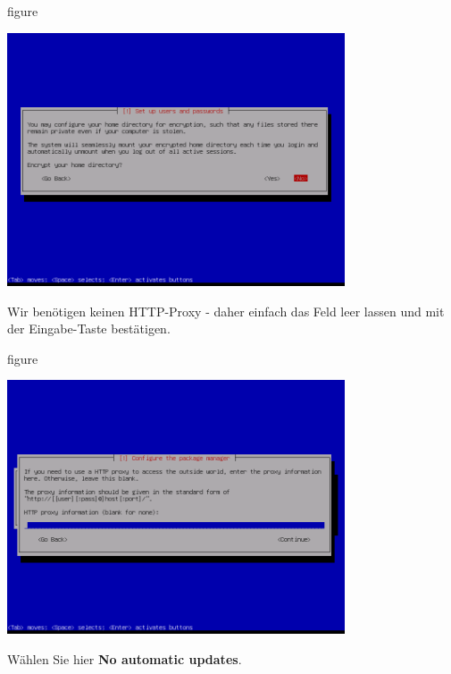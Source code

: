 \begin{nofloat}{figure}
\begin{center}
\includegraphics[width=0.75\textwidth]{screenshots/30_ubuntu_install.png}
\end{center}
\end{nofloat}
\newpage
Wir benötigen keinen HTTP-Proxy - daher einfach das Feld leer lassen
und mit der Eingabe-Taste bestätigen.

\begin{nofloat}{figure}
\begin{center}
\includegraphics[width=0.75\textwidth]{screenshots/31_ubuntu_install.png}
\end{center}
\end{nofloat}

Wählen Sie hier \textbf{No automatic updates}.

